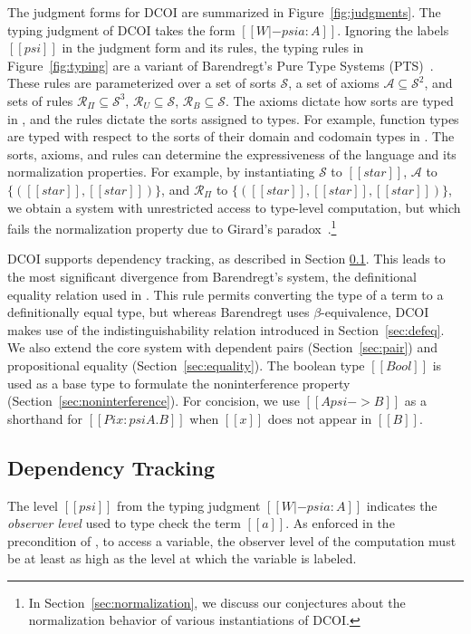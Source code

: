 \documentclass[acmsmall]{acmart}
\newcommand{\name}{DCOI\xspace}
\newcommand{\Name}{DCOI\xspace}
\begin{document}
\ifextended
The judgment forms for \name are summarized in Figure~\ref{fig:judgments}.
\fi
The typing judgment of \name takes the form
$[[W |- psi a : A]]$.
Ignoring the labels $[[psi]]$ in the judgment
form and its rules, the typing rules in
Figure~\ref{fig:typing} are a variant of Barendregt's Pure Type Systems (PTS)~\citep{barendregt:lambda-calculi-with-types}.
These rules are parameterized over a set of sorts $\mathcal{S}$, a set of axioms $\mathcal{A}\subseteq \mathcal{S}^2$,
and sets of rules $\mathcal{R}_\Pi \subseteq \mathcal{S}^3$,
$\mathcal{R}_U \subseteq \mathcal{S}$, $\mathcal{R}_B \subseteq \mathcal{S}$.
The axioms dictate how sorts are typed in ,
and the rules dictate the sorts assigned to types.
For example, function types are typed with respect to
the sorts of their domain and codomain types in .
The sorts, axioms, and rules can determine the expressiveness
of the language and its normalization properties.
For example, by instantiating $\mathcal{S}$ to ${[[star]]}$, $\mathcal{A}$ to $\{([[star]],[[star]])\}$, and
$\mathcal{R}_\Pi$ to $\{([[star]],[[star]],[[star]])\}$, we obtain a
system with unrestricted access to type-level computation,
but which fails the normalization property due to Girard's paradox~\citep{girard-thesis}.\footnote{In Section~\ref{sec:normalization}, we discuss our
conjectures about the normalization behavior of various instantiations of \name{}.}

\Name supports dependency tracking, as described in Section \ref{sec:dep}. This leads
to the most significant divergence from Barendregt's system, the definitional equality
relation used in .
This rule permits converting the type of a term to a definitionally equal
type, but whereas Barendregt uses $\beta$-equivalence, \name{} makes use of the
indistinguishability relation introduced in Section~\ref{sec:defeq}.
We also extend the core system with dependent pairs
(Section~\ref{sec:pair}) and propositional equality
(Section~\ref{sec:equality}). The boolean type $[[Bool]]$ is used as a
base type to formulate the noninterference property (Section~\ref{sec:noninterference}).
For concision, we use $[[A psi -> B]]$ as a shorthand for $[[Pi x :
psi A . B]]$ when $[[x]]$ does not appear in $[[B]]$. 

\subsection{Dependency Tracking}\label{sec:dep}
The level $[[psi]]$ from the typing judgment $[[W |- psi a : A]]$ 
indicates the \emph{observer level} used to type check the term
$[[a]]$. As enforced in the precondition of , to access a variable,
the observer level of the computation must be at least as high as the level
at which the variable is labeled. 
\end{document}
